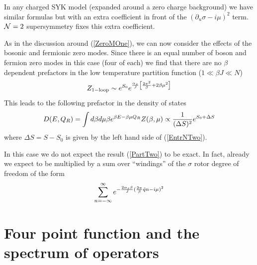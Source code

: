 \documentclass[aps,pre,preprint,onecolumn,citeautoscript,superscriptaddress,nofootinbib,eqsecnum]{revtex4-1}
\def\nref#1{(\ref{#1})}
\def\be{\begin{equation}}
\def\ee{\end{equation}}
\begin{document}
   In any charged SYK model (expanded around a zero charge background) 
 we have  similar formulas but with an extra coefficient in front of the 
$(\partial_u \sigma - i \mu)^2 $ term. 
 ${\cal N}=2$ supersymmetry  fixes this extra coefficient.   
    
As in the discussion around \nref{ZeroMOne}, we can now consider the effects of the bosonic and 
fermionic zero modes. Since there is an equal number of boson and fermion zero modes in this case (four of
each) we find that there are no $\beta$ dependent prefactors in the low temperature  partition function 
($ 1\ll \beta J \ll N $)
\be \label{PartTwo}
 Z_{\rm 1-loop} \sim {  } e^{ S_0} e^{  { \alpha_s \over  J } \left[ {   2 \pi ^2 \over \beta}   + 2  \beta \mu^2 \right] } 
\ee
This leads to the following prefactor in the density of states 
\be
D(E,Q_R) = \int d \beta  d\mu \beta e^{ \beta E - \beta \mu Q_R} Z(\beta , \mu ) \propto  { 1 \over (\Delta S)^2 } e^{S_0 + \Delta S }
\ee 
where $\Delta S = S - S_0 $ is given by the left hand side of \nref{EntrNTwo}.
 
In this case we do not expect the result \nref{PartTwo} to be exact. In fact, already we expect to be 
multiplied by a sum over ``windings'' of  the $\sigma$ rotor degree of freedom of the form 
\be
 \sum_{n=-\infty}^\infty   e^{ - { 2 \alpha_s \beta \over J } (  { 2 \pi \over \beta } \hat q n - i \mu)^2 }
\ee


\section{Four point function and the spectrum of operators } 
\label{4pt} 
\end{document}
